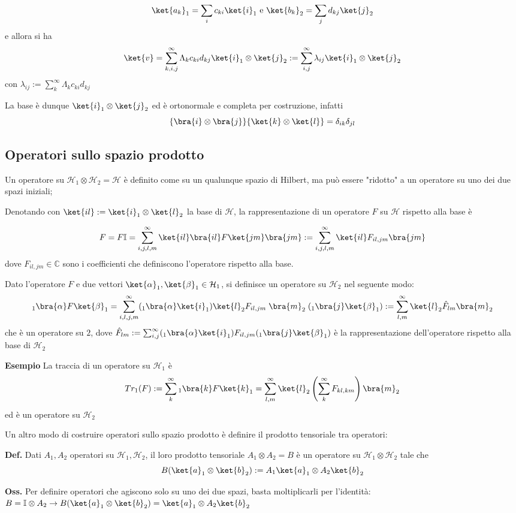 $$\ket{a_k}_1 = \sum_{i}^{}c_{ki}\ket{i}_1 \text{ e }
\ket{b_k}_2 = \sum_{j}^{}d_{kj}\ket{j}_2$$ 
e allora si ha
$$
\ket{v} = \sum_{k,i,j}^{\infty} \Lambda_k c_{ki}d_{kj}\ket{i}_1\otimes\ket{j}_2 :=
\sum_{i,j}^{\infty} \lambda_{ij}\ket{i}_1\otimes\ket{j}_2
$$
con $\lambda_{ij}:=\sum_{k}^{\infty}\Lambda_k c_{ki} d_{kj}$

La base è dunque $\ket{i}_1\otimes\ket{j}_2$ ed è ortonormale e completa per costruzione,
infatti 
$$\{\bra{i}\otimes\bra{j}\}\{\ket{k}\otimes\ket{l}\} = \delta_{ik}\delta_{jl}$$
\subsection{Operatori sullo spazio prodotto}
Un operatore su $\mathcal{H}_1\otimes\mathcal{H}_2 = \mathcal{H}$ è definito come su un qualunque
spazio di Hilbert, ma può essere "ridotto" a un operatore su uno dei due spazi iniziali;

Denotando con $\ket{il}:=\ket{i}_1\otimes\ket{l}_2$ la base di $\mathcal{H}$, la rappresentazione
di un operatore $F$ su $\mathcal{H}$ rispetto alla base è

$$
F = F\mathbb{I} = \sum_{i,j,l,m}^{\infty} \ket{il}\bra{il}F\ket{jm}\bra{jm} :=
\sum_{i,j,l,m}^{\infty} \ket{il}F_{il,jm}\bra{jm}
$$
dove $F_{il,jm}\in\mathbb{C}$ sono i coefficienti che definiscono l'operatore rispetto alla base.

Dato l'operatore $F$ e due vettori $\ket{\alpha}_1,\ket{\beta}_1\in\mathcal{H}_1$, si definisce un
operatore su $\mathcal{H}_2$ nel seguente modo:
$$
_1\bra{\alpha}F\ket{\beta}_1 = \sum_{i,l,j,m}^{\infty} ({}_1\bra{\alpha}\ket{i}_1)\ket{l}_2 F_{il,jm}
\;\bra{m}_2\; ({}_1\bra{j}\ket{\beta}_1) := 
\sum_{l,m}^{\infty} \ket{l}_2 \hat{F}_{lm}\bra{m}_2
$$
che è un operatore su $\mathcal{2}$, dove
$\hat{F}_{lm} := \sum_{i,j}^{\infty} ({}_1\bra{\alpha}\ket{i}_1) F_{il,jm} ({}_1\bra{j}\ket{\beta}_1) $
è la rappresentazione dell'operatore rispetto alla base di $\mathcal{H}_2$

\textbf{Esempio} La traccia di un operatore su $\mathcal{H}_1$ è 
$$Tr_1(F) := \sum_{k}^{\infty} {}_1\bra{k}F\ket{k}_1 =
\sum_{l,m}^{\infty} \ket{l}_2 \left(\sum_{k}^{\infty} F_{kl,km} \right)\bra{m}_2$$
ed è un operatore su $\mathcal{H}_2$


Un altro modo di costruire operatori sullo spazio prodotto è definire il prodotto tensoriale tra
operatori:

\textbf{Def.} Dati $A_1,A_2$ operatori su $\mathcal{H}_1,\mathcal{H}_2$, il loro prodotto tensoriale
$A_1\otimes A_2 = B$ è un operatore su $\mathcal{H}_1\otimes\mathcal{H}_2$ tale che
$$
B(\ket{a}_1\otimes\ket{b}_2) := A_1\ket{a}_1\otimes A_2\ket{b}_2
$$


\textbf{Oss.} Per definire operatori che agiscono solo su uno dei due spazi, basta moltiplicarli
per l'identità: $B=\mathbb{I}\otimes{A_2} \to B(\ket{a}_1\otimes\ket{b}_2) =
\ket{a}_1\otimes A_2\ket{b}_2$

